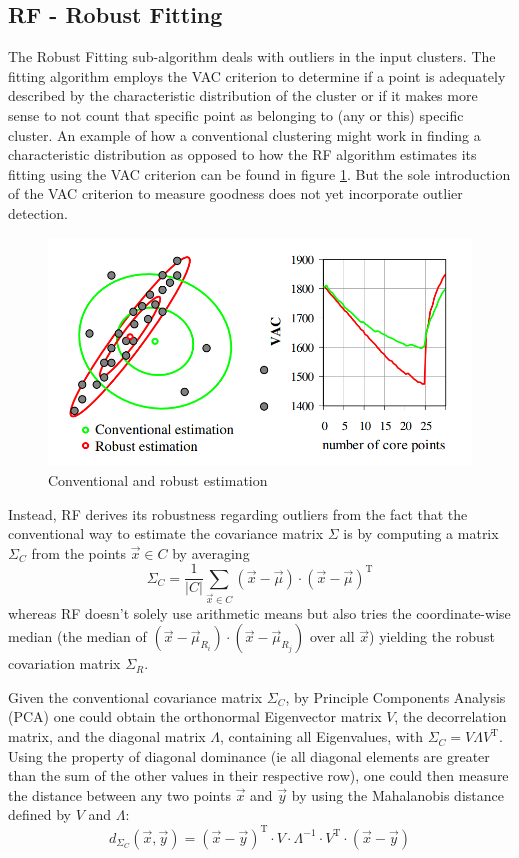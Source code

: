 \documentclass[conference]{IEEEtran}
\begin{document}
\subsection{RF - Robust Fitting}
The Robust Fitting sub-algorithm deals with outliers in the input clusters. The fitting algorithm employs the VAC criterion to determine if a point is adequately described by the characteristic distribution of the cluster or if it makes more sense to not count that specific point as belonging to (any or this) specific cluster. An example of how a conventional clustering might work in finding a characteristic distribution as opposed to how the RF algorithm estimates its fitting using the VAC criterion can be found in figure \ref{fig:robust_estimation}. But the sole introduction of the VAC criterion to measure goodness does not yet incorporate outlier detection.

\begin{figure}
  \centering
  \noindent\includegraphics[width=\linewidth]{imgs/robust_estimation}
  \caption[]{Conventional and robust estimation\cite{Bohm2006-ts}}
  \label{fig:robust_estimation}
\end{figure}

Instead, RF derives its robustness regarding outliers from the fact that the conventional way to estimate the covariance matrix $ \Sigma $ is by computing a matrix $ \Sigma_C $ from the points $ \vec{x} \in C $ by averaging
\[ \Sigma_C = \frac{1}{|C|} \sum_{\vec{x} \in C} (\vec{x} - \vec{\mu}) \cdot (\vec{x} - \vec{\mu})^\text{T} \]
whereas RF doesn't solely use arithmetic means but also tries the coordinate-wise median (the median of $ (\vec{x} - \vec{\mu}_{R_i}) \cdot (\vec{x} - \vec{\mu}_{R_j}) $ over all $ \vec{x} $) yielding the robust covariation matrix $ \Sigma_R $.

Given the conventional covariance matrix $ \Sigma_C $, by Principle Components Analysis (PCA) one could obtain the orthonormal Eigenvector matrix $ V $, the decorrelation matrix, and the diagonal matrix $ \Lambda $, containing all Eigenvalues, with $ \Sigma_C = V \Lambda V^\text{T} $. Using the property of diagonal dominance (ie all diagonal elements are greater than the sum of the other values in their respective row), one could then measure the distance between any two points $ \vec{x} $ and $ \vec{y} $ by using the Mahalanobis distance\cite{Mahalanobis1936-wy} defined by $ V $ and $ \Lambda $:
\[ d_{\Sigma_C}(\vec{x}, \vec{y}) = (\vec{x} - \vec{y})^\text{T} \cdot V \cdot \Lambda^{-1} \cdot V^\text{T} \cdot (\vec{x} - \vec{y}) \]
\end{document}
